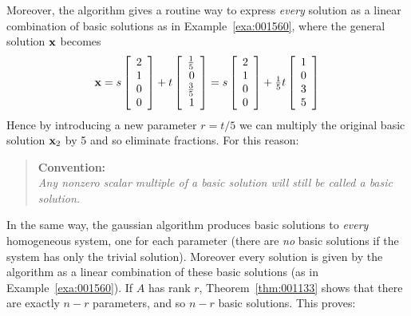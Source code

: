 \noindent Moreover, the algorithm gives a routine way to express \textit{every} solution as a linear combination of basic solutions as in Example~\ref{exa:001560}, where the general solution $\textbf{x}$ becomes
\begin{equation*}
\textbf{x} = s
\left[ \begin{array}{r}
	2 \\
	1 \\
	0 \\
	0
\end{array} \right]
+ t
\left[ \begin{array}{r}
	\tfrac{1}{5} \\
	0 \\
	\tfrac{3}{5} \\
	1 
\end{array} \right]
= s
\left[ \begin{array}{r}
	2 \\
	1 \\
	0 \\
	0
\end{array} \right]
+ \tfrac{1}{5}t
\left[ \begin{array}{r}
	1 \\
	0 \\
	3 \\
	5
\end{array} \right]
\end{equation*}
Hence by introducing a new parameter $r = t/5$ we can multiply the original basic solution $\textbf{x}_2$ by 5 and so eliminate fractions. For this reason:

\begin{quotation}
\noindent\textbf{Convention:} \\  \noindent\textit{Any nonzero scalar multiple of a basic solution will still be called a basic solution.}
\end{quotation}

In the same way, the gaussian algorithm produces basic solutions to \textit{every} homogeneous system, one for each parameter (there are \textit{no} basic solutions if the system has only the trivial solution). Moreover every solution is given by the algorithm as a linear combination of 
these basic solutions (as in Example~\ref{exa:001560}). If $A$ has rank $r$, Theorem~\ref{thm:001133} shows that there are exactly $n-r$ parameters, and so $n-r$ basic solutions. This proves:

